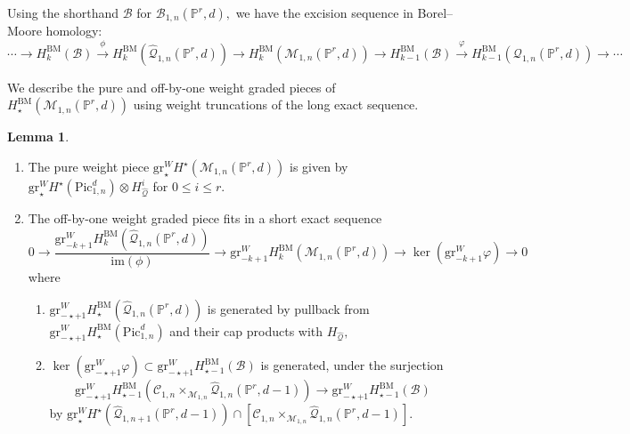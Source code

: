 \documentclass[12pt,reqno]{amsart}
\theoremstyle{definition}
\theoremstyle{definition}
\theoremstyle{definition}
\theoremstyle{definition}
\newtheorem{lemma}[theorem]{Lemma}
\newcommand{\PP}{\mathbb{P}}
\newcommand{\gr}{\mathrm{gr}}
\begin{document}
Using the shorthand $\mathcal{B}$ for $\mathcal{B}_{1,n}(\mathbb{P}^r,d),$ we have the excision sequence in Borel--Moore homology: \[\cdots\to H^{\mathrm{BM}}_{k}(\mathcal{B}) \xrightarrow{\phi} H^{\mathrm{BM}}_{k} (\hat{\mathcal{Q}}_{1,n}(\mathbb{P}^r,d))\to  H^{\mathrm{BM}}_{k} (\mathcal{M}_{1,n}(\mathbb{P}^r,d))\to H^{\mathrm{BM}}_{k-1}(\mathcal{B})\xrightarrow{\varphi} H_{k-1}^{\mathrm{BM}}(\mathcal{Q}_{1,n}(\mathbb{P}^r,d))\to \cdots\]

We describe the pure and off-by-one weight graded pieces of $H_\star^{\mathrm{BM}}(\mathcal{M}_{1,n}(\PP^r,d))$ using weight truncations of the long exact sequence. 


\begin{lemma}\label{lem:m1nrd} \label{lem:m1nrdoff}
  \begin{enumerate}
    \item The pure weight piece $\mathrm{gr}^W_\star H^\star(\mathcal{M}_{1,n}(\mathbb{P}^r,d))$ is given by $\mathrm{gr}^W_\star H^\star(\mathrm{Pic}^d_{1,n})\otimes H_{\hat{\mathcal{Q}}}^i$ for $ 0 \leq i\leq r.$
    \item The off-by-one weight graded piece fits in a short exact sequence \begin{equation} 0\to \frac{\mathrm{gr}^W_{-k+1}H_k^{\mathrm{BM}}(\hat{\mathcal{Q}}_{1,n}(\mathbb{P}^r,d))}{\mathrm{im}(\phi)}\to \mathrm{gr}^W_{-k+1} H_k^{\mathrm{BM}}(\mathcal{M}_{1,n}(\PP^r,d))\to \ker(\gr^W_{-k+1}\varphi)\to 0\end{equation} where \begin{enumerate}
    \item $\gr^{W}_{-\star+1}H_\star^{\mathrm{BM}}(\hat{\mathcal{Q}}_{1,n}(\PP^r,d))$ is generated by pullback from $\gr^{W}_{-\star+1}H_\star^{\mathrm{BM}}(\mathrm{Pic}^d_{1,n})$ and their cap products with $H_{\hat{\mathcal{Q}}},$
    \item $\ker(\gr^W_{-\star+1}\varphi)\subset \gr^W_{-\star+1} H_{{\star-1}}^{\mathrm{BM}}(\mathcal{B})$ is generated, under the surjection $$\gr^W_{-\star+1} H_{{\star-1}}^{\mathrm{BM}}(\mathcal{C}_{1,n}\times_{\mathcal{M}_{1,n}}\hat{\mathcal{Q}}_{1,n}(\PP^r,d-1))\to \gr^W_{-\star+1} H_{{\star-1}}^{\mathrm{BM}}(\mathcal{B})$$ by $\mathrm{gr}^W_{\star} H^\star(\hat{\mathcal{Q}}_{1,n+1}(\PP^r,d-1))\cap [\mathcal{C}_{1,n}\times_{\mathcal{M}_{1,n}}\hat{\mathcal{Q}}_{1,n}(\PP^r,d-1)].$
    \end{enumerate}
  \end{enumerate}
\end{lemma}
\end{document}
